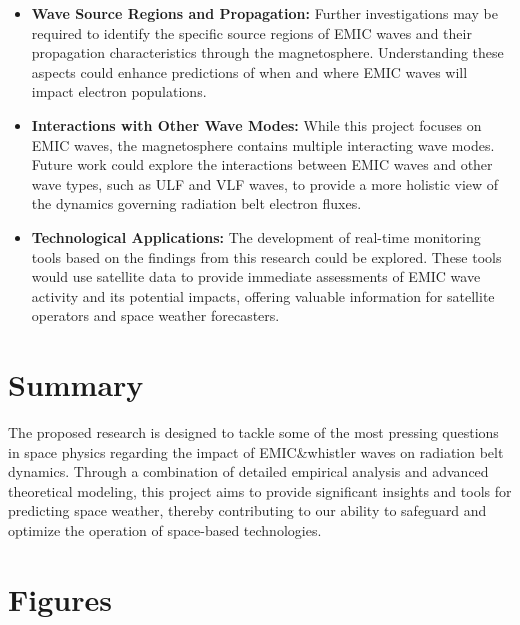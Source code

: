 \documentclass[
  letterpaper,
  DIV=11,
  numbers=noendperiod]{scrartcl}
\begin{document}
\begin{itemize}
\item
  \textbf{Wave Source Regions and Propagation:} Further investigations may be required to identify the specific source regions of EMIC waves and their propagation characteristics through the magnetosphere. Understanding these aspects could enhance predictions of when and where EMIC waves will impact electron populations.
\item
  \textbf{Interactions with Other Wave Modes:} While this project focuses on EMIC waves, the magnetosphere contains multiple interacting wave modes. Future work could explore the interactions between EMIC waves and other wave types, such as ULF and VLF waves, to provide a more holistic view of the dynamics governing radiation belt electron fluxes.
\item
  \textbf{Technological Applications:} The development of real-time monitoring tools based on the findings from this research could be explored. These tools would use satellite data to provide immediate assessments of EMIC wave activity and its potential impacts, offering valuable information for satellite operators and space weather forecasters.
\end{itemize}

\section{Summary}\label{summary}

The proposed research is designed to tackle some of the most pressing questions in space physics regarding the impact of EMIC\&whistler waves on radiation belt dynamics. Through a combination of detailed empirical analysis and advanced theoretical modeling, this project aims to provide significant insights and tools for predicting space weather, thereby contributing to our ability to safeguard and optimize the operation of space-based technologies.

\section{Figures}\label{figures}
\end{document}
